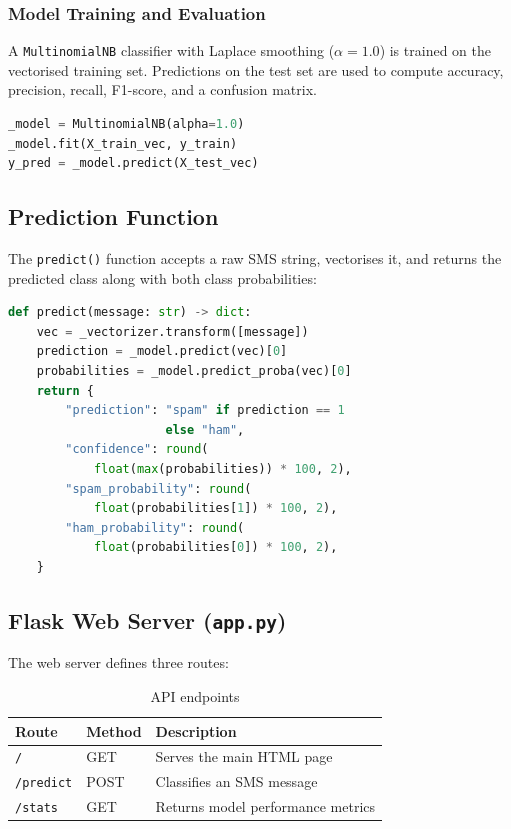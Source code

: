 \documentclass[paper=a4, fontsize=11pt]{scrartcl}
\numberwithin{equation}{section}
\numberwithin{figure}{section}
\numberwithin{table}{section}
\begin{document}
\subsubsection{Model Training and Evaluation}
A \texttt{MultinomialNB} classifier with Laplace smoothing ($\alpha = 1.0$) is trained on the vectorised training set.  Predictions on the test set are used to compute accuracy, precision, recall, F1-score, and a confusion matrix.

\begin{lstlisting}[language=Python, caption={Training and evaluating the classifier}]
_model = MultinomialNB(alpha=1.0)
_model.fit(X_train_vec, y_train)
y_pred = _model.predict(X_test_vec)
\end{lstlisting}

\subsection{Prediction Function}
The \texttt{predict()} function accepts a raw SMS string, vectorises it, and returns the predicted class along with both class probabilities:
\begin{lstlisting}[language=Python, caption={Prediction function}]
def predict(message: str) -> dict:
    vec = _vectorizer.transform([message])
    prediction = _model.predict(vec)[0]
    probabilities = _model.predict_proba(vec)[0]
    return {
        "prediction": "spam" if prediction == 1
                      else "ham",
        "confidence": round(
            float(max(probabilities)) * 100, 2),
        "spam_probability": round(
            float(probabilities[1]) * 100, 2),
        "ham_probability": round(
            float(probabilities[0]) * 100, 2),
    }
\end{lstlisting}

\subsection{Flask Web Server (\texttt{app.py})}
The web server defines three routes:

\begin{table}[h]
\centering
\caption{API endpoints}
\label{tab:api}
\begin{tabular}{@{} l l l @{}}
\toprule
\textbf{Route} & \textbf{Method} & \textbf{Description} \\
\midrule
\texttt{/}         & GET  & Serves the main HTML page \\
\texttt{/predict}  & POST & Classifies an SMS message \\
\texttt{/stats}    & GET  & Returns model performance metrics \\
\bottomrule
\end{tabular}
\end{table}
\end{document}
